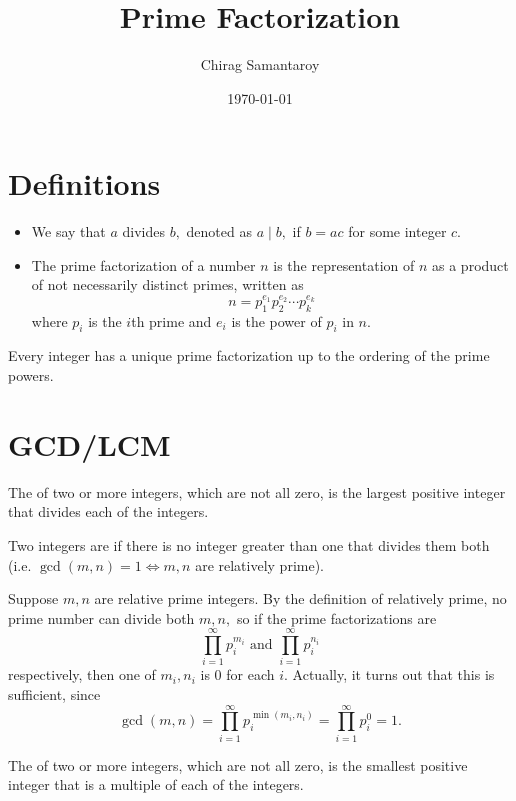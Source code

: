 \documentclass[11pt,paper=letter]{scrartcl}
\begin{document}
\title{Prime Factorization}
\author{Chirag Samantaroy}
\date{\today}

\maketitle

\section{Definitions}
\begin{itemize}
    \item We say that $a$ divides $b,$ denoted as $a \mid b,$ if $b = ac$ for some integer $c.$
    \item The prime factorization of a number $n$ is the representation of $n$ as a product of not necessarily distinct primes, written as $$n=p_1^{e_1}p_2^{e_2}\cdots p_k^{e_k}$$ where $p_i$ is the $i$th prime and $e_i$ is the power of $p_i$ in $n.$ 
\end{itemize}

\begin{probboxed}
Every integer has a unique prime factorization up to the ordering of the prime powers.
\end{probboxed}

\section{GCD/LCM}
The  of two or more integers, which are not all zero, is the largest positive integer that divides each of the integers.

Two integers are  if there is no integer greater than one that divides them both (i.e. $\gcd(m, n) = 1 \iff m, n$ are relatively prime).

Suppose $m, n$ are relative prime integers. By the definition of relatively prime, no prime number can divide both $m, n,$ so if the prime factorizations are \[\prod_{i=1}^{\infty} p_i^{m_i} \text{ and } \prod_{i=1}^{\infty} p_i^{n_i}\] respectively, then one of $m_i, n_i$ is $0$ for each $i.$ Actually, it turns out that this is sufficient, since \[\gcd(m, n) = \prod_{i=1}^{\infty} p_i^{\min(m_i, n_i)} = \prod_{i=1}^{\infty} p_i^0 = 1.\]

The  of two or more integers, which are not all zero, is the smallest positive integer that is a multiple of each of the integers.
\end{document}
